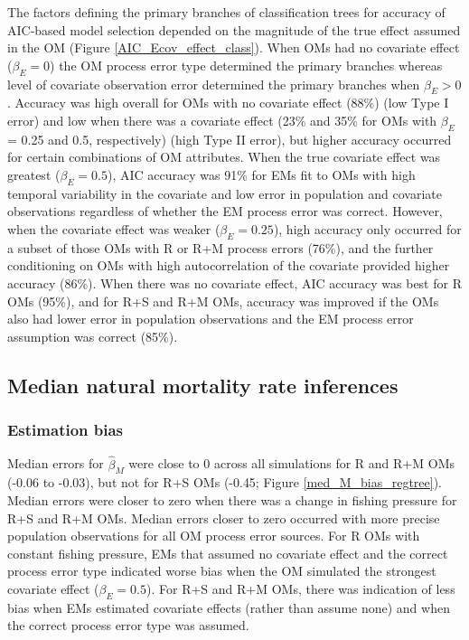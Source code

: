 \documentclass[
  12pt,
]{article}
\begin{document}
The factors defining the primary branches of classification trees for
accuracy of AIC-based model selection depended on the magnitude of the
true effect assumed in the OM (Figure \ref{AIC_Ecov_effect_class}). When
OMs had no covariate effect (\(\beta_E = 0\)) the OM process error type
determined the primary branches whereas level of covariate observation
error determined the primary branches when \(\beta_E>0\). Accuracy was
high overall for OMs with no covariate effect (88\%) (low Type I error)
and low when there was a covariate effect (23\% and 35\% for OMs with
\(\beta_E\) = 0.25 and 0.5, respectively) (high Type II error), but
higher accuracy occurred for certain combinations of OM attributes. When
the true covariate effect was greatest (\(\beta_E = 0.5\)), AIC accuracy
was 91\% for EMs fit to OMs with high temporal variability in the
covariate and low error in population and covariate observations
regardless of whether the EM process error was correct. However, when
the covariate effect was weaker (\(\beta_E = 0.25\)), high accuracy only
occurred for a subset of those OMs with R or R+M process errors (76\%),
and the further conditioning on OMs with high autocorrelation of the
covariate provided higher accuracy (86\%). When there was no covariate
effect, AIC accuracy was best for R OMs (95\%), and for R+S and R+M OMs,
accuracy was improved if the OMs also had lower error in population
observations and the EM process error assumption was correct (85\%).

\subsection*{Median natural mortality rate
inferences}\label{median-natural-mortality-rate-inferences}

\subsubsection*{Estimation bias}\label{estimation-bias}

Median errors for \(\widehat \beta_M\) were close to 0 across all
simulations for R and R+M OMs (-0.06 to -0.03), but not for R+S OMs
(-0.45; Figure \ref{med_M_bias_regtree}). Median errors were closer to
zero when there was a change in fishing pressure for R+S and R+M OMs.
Median errors closer to zero occurred with more precise population
observations for all OM process error sources. For R OMs with constant
fishing pressure, EMs that assumed no covariate effect and the correct
process error type indicated worse bias when the OM simulated the
strongest covariate effect (\(\beta_E = 0.5\)). For R+S and R+M OMs,
there was indication of less bias when EMs estimated covariate effects
(rather than assume none) and when the correct process error type was
assumed.
\end{document}
